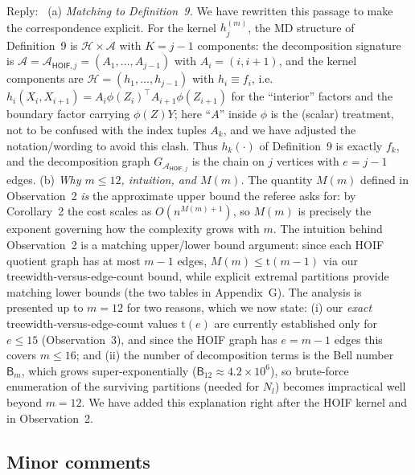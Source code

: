 \documentclass[12pt]{article}
\newenvironment{reply}{\par\smallskip\noindent\color{blue}Reply:\ \ignorespaces}{\par}
\newcommand{\less}{O}          %
\newcommand{\calA}{\mathcal{A}}
\newcommand{\calH}{\mathcal{H}}
\begin{document}
\begin{enumerate}
\begin{reply}
(a) \emph{Matching to Definition~9.} We have rewritten this passage to make the correspondence explicit. For the kernel $h_j^{(m)}$, the MD structure of Definition~9 is $\calH\times\calA$ with $K=j-1$ components: the decomposition signature is $\calA=\calA_{\mathsf{HOIF},j}=(A_1,\dots,A_{j-1})$ with $A_i=(i,i+1)$, and the kernel components are $\calH=(h_1,\dots,h_{j-1})$ with $h_i\equiv f_i$, i.e.\ $h_i(X_i,X_{i+1})=A_i\phi(Z_i)^{\top}A_{i+1}\phi(Z_{i+1})$ for the ``interior'' factors and the boundary factor carrying $\phi(Z)Y$; here ``$A$'' inside $\phi$ is the (scalar) treatment, not to be confused with the index tuples $A_k$, and we have adjusted the notation/wording to avoid this clash. Thus $h_k(\cdot)$ of Definition~9 is exactly $f_k$, and the decomposition graph $G_{\calA_{\mathsf{HOIF},j}}$ is the chain on $j$ vertices with $e=j-1$ edges. (b) \emph{Why $m\le 12$, intuition, and $M(m)$.} The quantity $M(m)$ defined in Observation~2 \emph{is} the approximate upper bound the referee asks for: by Corollary~2 the cost scales as $\less(n^{M(m)+1})$, so $M(m)$ is precisely the exponent governing how the complexity grows with $m$. The intuition behind Observation~2 is a matching upper/lower bound argument: since each HOIF quotient graph has at most $m-1$ edges, $M(m)\le \mathrm{t}(m-1)$ via our treewidth-versus-edge-count bound, while explicit extremal partitions provide matching lower bounds (the two tables in Appendix~G). The analysis is presented up to $m=12$ for two reasons, which we now state: (i) our \emph{exact} treewidth-versus-edge-count values $\mathrm{t}(e)$ are currently established only for $e\le 15$ (Observation~3), and since the HOIF graph has $e=m-1$ edges this covers $m\le 16$; and (ii) the number of decomposition terms is the Bell number $\mathsf{B}_m$, which grows super-exponentially ($\mathsf{B}_{12}\approx 4.2\times 10^{6}$), so brute-force enumeration of the surviving partitions (needed for $N_l$) becomes impractical well beyond $m=12$. We have added this explanation right after the HOIF kernel and in Observation~2.
\end{reply}

\end{enumerate}

\subsection*{Minor comments}
\end{document}
